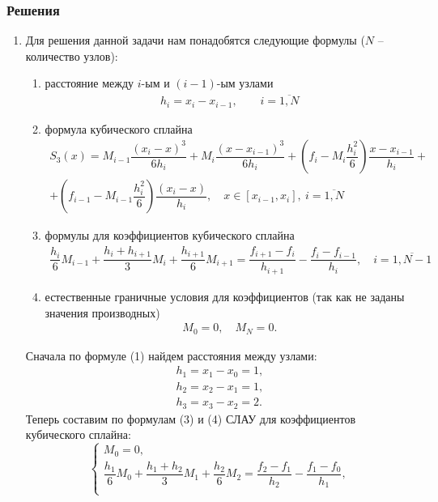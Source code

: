 \documentclass[a4paper, 12pt]{article}
\begin{document}
	\newpage
	\subsubsection*{Решения}
	\begin{enumerate}
		
		\item \hypertarget{t1}{}
		Для решения данной задачи нам понадобятся следующие формулы ($N$ -- количество узлов):\begin{enumerate}
			\item расстояние между $i$-ым и $(i-1)$-ым узлами \begin{eqnarray}
				h_i=x_i - x_{i-1},\qquad i=\overline{1,N}\label{1}
			\end{eqnarray}
			\item формула кубического сплайна\begin{multline}
				S_3(x) = M_{i-1}\dfrac{(x_i - x)^3}{6h_i} + M_{i}\dfrac{(x-x_{i-1})^3}{6h_i} + \left(f_i - M_i\dfrac{h_i^2}{6}\right)\dfrac{x-x_{i-1}}{h_i} +\\+ \left(f_{i-1} - M_{i-1}\dfrac{h_i^2}{6}\right)\dfrac{(x_i - x)}{h_i},\quad x\in [x_{i-1}, x_i],\ i = \overline{1,N}
			\end{multline}
			\item формулы для коэффициентов кубического сплайна
			\begin{multline}
				\dfrac{h_i}{6}M_{i-1} + \dfrac{h_i + h_{i+1}}{3}M_i + \dfrac{h_{i+1}}{6}M_{i+1} = \dfrac{f_{i+1} - f_i}{h_{i+1}} - \dfrac{f_i - f_{i-1}}{h_i},\quad i = \overline {1,N-1}
			\end{multline}
			\item естественные граничные условия для коэффициентов (так как не заданы значения производных) \begin{eqnarray}
				M_0 = 0,\quad M_N = 0.
			\end{eqnarray}
		\end{enumerate}
		Сначала по формуле (1) найдем расстояния между узлами:
		$$\begin{matrix}
			h_1 = x_1 - x_0 = 1,\\
			h_2 = x_2 - x_1 = 1,\\
			h_3 = x_3 - x_2 = 2.
		\end{matrix}$$
		Теперь составим по формулам (3) и (4) СЛАУ для коэффициентов кубического сплайна:
		$$\begin{cases}
			M_0 = 0,\\
			\dfrac{h_1}{6}M_{0} + \dfrac{h_1 + h_{2}}{3}M_1 + \dfrac{h_{2}}{6}M_{2} = \dfrac{f_{2} - f_1}{h_{2}} - \dfrac{f_1 - f_{0}}{h_1},\\

\end{cases}$$
\end{enumerate}
\end{document}
